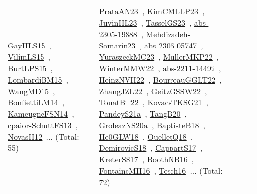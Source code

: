 {\begin{longtable}{lp{3cm}>{\raggedright\arraybackslash}p{6cm}>{\raggedright\arraybackslash}p{6cm}>{\raggedright\arraybackslash}p{8cm}}
\href{papers/GayHLS15.pdf}{GayHLS15}~\cite{GayHLS15}, \href{papers/VilimLS15.pdf}{VilimLS15}~\cite{VilimLS15}, \href{papers/BurtLPS15.pdf}{BurtLPS15}~\cite{BurtLPS15}, \href{papers/LombardiBM15.pdf}{LombardiBM15}~\cite{LombardiBM15}, \href{articles/WangMD15.pdf}{WangMD15}~\cite{WangMD15}, \href{papers/BonfiettiLM14.pdf}{BonfiettiLM14}~\cite{BonfiettiLM14}, \href{articles/KameugneFSN14.pdf}{KameugneFSN14}~\cite{KameugneFSN14}, \href{papers/cpaior-SchuttFS13.pdf}{cpaior-SchuttFS13}~\cite{cpaior-SchuttFS13}, \href{articles/NovasH12.pdf}{NovasH12}~\cite{NovasH12}... (Total: 55) & \href{articles/PrataAN23.pdf}{PrataAN23}~\cite{PrataAN23}, \href{papers/KimCMLLP23.pdf}{KimCMLLP23}~\cite{KimCMLLP23}, \href{papers/JuvinHL23.pdf}{JuvinHL23}~\cite{JuvinHL23}, \href{papers/TasselGS23.pdf}{TasselGS23}~\cite{TasselGS23}, \href{articles/abs-2305-19888.pdf}{abs-2305-19888}~\cite{abs-2305-19888}, \href{papers/Mehdizadeh-Somarin23.pdf}{Mehdizadeh-Somarin23}~\cite{Mehdizadeh-Somarin23}, \href{articles/abs-2306-05747.pdf}{abs-2306-05747}~\cite{abs-2306-05747}, \href{papers/YuraszeckMC23.pdf}{YuraszeckMC23}~\cite{YuraszeckMC23}, \href{articles/MullerMKP22.pdf}{MullerMKP22}~\cite{MullerMKP22}, \href{papers/WinterMMW22.pdf}{WinterMMW22}~\cite{WinterMMW22}, \href{articles/abs-2211-14492.pdf}{abs-2211-14492}~\cite{abs-2211-14492}, \href{articles/HeinzNVH22.pdf}{HeinzNVH22}~\cite{HeinzNVH22}, \href{articles/BourreauGGLT22.pdf}{BourreauGGLT22}~\cite{BourreauGGLT22}, \href{papers/ZhangJZL22.pdf}{ZhangJZL22}~\cite{ZhangJZL22}, \href{papers/GeitzGSSW22.pdf}{GeitzGSSW22}~\cite{GeitzGSSW22}, \href{papers/TouatBT22.pdf}{TouatBT22}~\cite{TouatBT22}, \href{papers/KovacsTKSG21.pdf}{KovacsTKSG21}~\cite{KovacsTKSG21}, \href{articles/PandeyS21a.pdf}{PandeyS21a}~\cite{PandeyS21a}, \href{papers/TangB20.pdf}{TangB20}~\cite{TangB20}, \href{papers/GroleazNS20a.pdf}{GroleazNS20a}~\cite{GroleazNS20a}, \href{articles/BaptisteB18.pdf}{BaptisteB18}~\cite{BaptisteB18}, \href{papers/He0GLW18.pdf}{He0GLW18}~\cite{He0GLW18}, \href{papers/OuelletQ18.pdf}{OuelletQ18}~\cite{OuelletQ18}, \href{papers/DemirovicS18.pdf}{DemirovicS18}~\cite{DemirovicS18}, \href{papers/CappartS17.pdf}{CappartS17}~\cite{CappartS17}, \href{articles/KreterSS17.pdf}{KreterSS17}~\cite{KreterSS17}, \href{papers/BoothNB16.pdf}{BoothNB16}~\cite{BoothNB16}, \href{papers/FontaineMH16.pdf}{FontaineMH16}~\cite{FontaineMH16}, \href{papers/Tesch16.pdf}{Tesch16}~\cite{Tesch16}... (Total: 72)\\

\end{longtable}}
